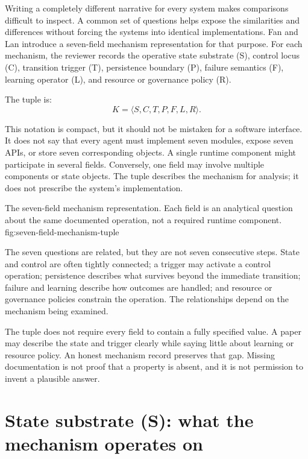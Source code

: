 Writing a completely different narrative for every system makes comparisons difficult to inspect. A common set of questions helps expose the similarities and differences without forcing the systems into identical implementations. Fan and Lan introduce a seven-field mechanism representation for that purpose. For each mechanism, the reviewer records the operative state substrate (S), control locus (C), transition trigger (T), persistence boundary (P), failure semantics (F), learning operator (L), and resource or governance policy (R).

The tuple is:
\[
  K = \langle S, C, T, P, F, L, R \rangle.
\]

This notation is compact, but it should not be mistaken for a software interface. It does not say that every agent must implement seven modules, expose seven APIs, or store seven corresponding objects. A single runtime component might participate in several fields. Conversely, one field may involve multiple components or state objects. The tuple describes the mechanism for analysis; it does not prescribe the system's implementation.

  {The seven-field mechanism representation. Each field is an analytical question about the same documented operation, not a required runtime component.}
  {fig:seven-field-mechanism-tuple}

The seven questions are related, but they are not seven consecutive steps. State and control are often tightly connected; a trigger may activate a control operation; persistence describes what survives beyond the immediate transition; failure and learning describe how outcomes are handled; and resource or governance policies constrain the operation. The relationships depend on the mechanism being examined.

\begin{notebox}
The tuple does not require every field to contain a fully specified value. A paper may describe the state and trigger clearly while saying little about learning or resource policy. An honest mechanism record preserves that gap. Missing documentation is not proof that a property is absent, and it is not permission to invent a plausible answer.
\end{notebox}

\section{State substrate (S): what the mechanism operates on}
\label{sec:field-state}


